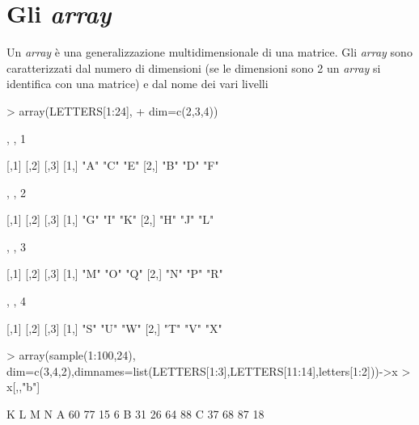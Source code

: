 \documentclass[onecolumn,12pt]{book}
\begin{document}
\section{Gli \emph{array}}
Un \emph{array}  \`e una generalizzazione multidimensionale di una matrice. Gli \emph{array} sono caratterizzati dal numero di dimensioni  (se le dimensioni sono 2 un \emph{array} si identifica con una  matrice) e dal nome dei vari livelli
\begin{Schunk}
\begin{Sinput}
> array(LETTERS[1:24],
+ dim=c(2,3,4))
\end{Sinput}
\begin{Soutput}
, , 1

     [,1] [,2] [,3]
[1,] "A"  "C"  "E" 
[2,] "B"  "D"  "F" 

, , 2

     [,1] [,2] [,3]
[1,] "G"  "I"  "K" 
[2,] "H"  "J"  "L" 

, , 3

     [,1] [,2] [,3]
[1,] "M"  "O"  "Q" 
[2,] "N"  "P"  "R" 

, , 4

     [,1] [,2] [,3]
[1,] "S"  "U"  "W" 
[2,] "T"  "V"  "X" 
\end{Soutput}
\begin{Sinput}
> array(sample(1:100,24), dim=c(3,4,2),dimnames=list(LETTERS[1:3],LETTERS[11:14],letters[1:2]))->x
> x[,,"b"]
\end{Sinput}
\begin{Soutput}
   K  L  M  N
A 60 77 15  6
B 31 26 64 88
C 37 68 87 18
\end{Soutput}
\end{Schunk}
\end{document}
